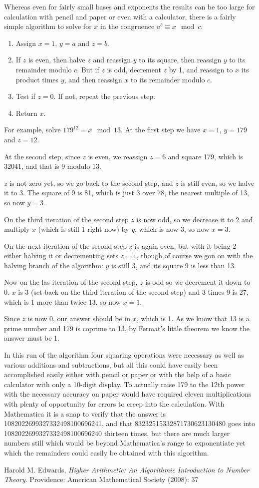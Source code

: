 \documentclass[12pt]{article}
\begin{document}
Whereas even for fairly small bases and exponents the results can be too large for calculation with pencil and paper or even with a calculator, there is a fairly simple algorithm to solve for $x$ in the congruence $a^b \equiv x \mod c$.

\begin{enumerate}
\item Assign $x = 1$, $y = a$ and $z = b$.
\item If $z$ is even, then halve $z$ and reassign $y$ to its square, then reassign $y$ to its remainder modulo $c$. But if $z$ is odd, decrement $z$ by 1, and reassign to $x$ its product times $y$, and then reassign $x$ to its remainder modulo $c$.
\item Test if $z = 0$. If not, repeat the previous step.
\item Return $x$.
\end{enumerate}

For example, solve $179^{12} = x \mod 13$. At the first step we have $x = 1$, $y = 179$ and $z = 12$.

At the second step, since $z$ is even, we reassign $z = 6$ and square 179, which is 32041, and that is 9 modulo 13.

$z$ is not zero yet, so we go back to the second step, and $z$ is still even, so we halve it to 3. The square of 9 is 81, which is just 3 over 78, the nearest multiple of 13, so now $y = 3$.

On the third iteration of the second step $z$ is now odd, so we decrease it to 2 and multiply $x$ (which is still 1 right now) by $y$, which is now 3, so now $x = 3$.

On the next iteration of the second step $z$ is again even, but with it being 2 either halving it or decrementing sets $z = 1$, though of course we gon on with the halving branch of the algorithm: $y$ is still 3, and its square 9 is less than 13.

Now on the las iteration of the second step, $z$ is odd so we decrement it down to 0. $x$ is 3 (set back on the third iteration of the second step) and 3 times 9 is 27, which is 1 more than twice 13, so now $x = 1$.

Since $z$ is now 0, our answer should be in $x$, which is 1. As we know that 13 is a prime number and 179 is coprime to 13, by Fermat's little theorem we know the answer must be 1.

In this run of the algorithm four squaring operations were necessary as well as various additions and subtractions, but all this could have easily been accomplished easily either with pencil or paper or with the help of a basic calculator with only a 10-digit display. To actually raise 179 to the 12th power with the necessary accuracy on paper would have required eleven multiplications with plenty of opportunity for errors to creep into the calculation. With Mathematica it is a snap to verify that the answer is 1082022699327332498100696241, and that 83232515332871730623130480 goes into  1082022699327332498100696240 thirteen times, but there are much larger numbers still which would be beyond Mathematica's range to exponentiate yet which the remainders could easily be obtained with this algorithm.

\begin{thebibliography}{1}
 Harold M. Edwards, {\it Higher Arithmetic: An Algorithmic Introduction to Number Theory}. Providence: American Mathematical Society (2008): 37
\end{thebibliography}
\end{document}
